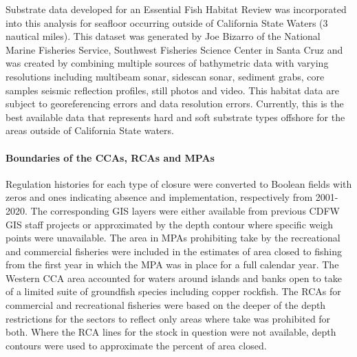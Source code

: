 \documentclass[11pt,
  english,
  a4paper,
]{article}
\begin{document}
Substrate data developed for an Essential Fish Habitat Review was incorporated into this analysis for seafloor occurring outside of California State Waters (3 nautical miles). This dataset was generated by Joe Bizarro of the National Marine Fisheries Service, Southwest Fisheries Science Center in Santa Cruz and was created by combining multiple sources of bathymetric data with varying resolutions including multibeam sonar, sidescan sonar, sediment grabs, core samples seismic reflection profiles, still photos and video. This habitat data are subject to georeferencing errors and data resolution errors. Currently, this is the best available data that represents hard and soft substrate types offshore for the areas outside of California State waters.

\leavevmode\tagmcend\tagstructend\par


\hypertarget{boundaries-of-the-ccas-rcas-and-mpas}{%
\paragraph{Boundaries of the CCAs, RCAs and MPAs}\label{boundaries-of-the-ccas-rcas-and-mpas}}

\leavevmode\tagmcend\tagstructend


Regulation histories for each type of closure were converted to Boolean fields with zeros and ones indicating absence and implementation, respectively from 2001-2020. The corresponding GIS layers were either available from previous CDFW GIS staff projects or approximated by the depth contour where specific weigh points were unavailable. The area in MPAs prohibiting take by the recreational and commercial fisheries were included in the estimates of area closed to fishing from the first year in which the MPA was in place for a full calendar year. The Western CCA area accounted for waters around islands and banks open to take of a limited suite of groundfish species including copper rockfish. The RCAs for commercial and recreational fisheries were based on the deeper of the depth restrictions for the sectors to reflect only areas where take was prohibited for both. Where the RCA lines for the stock in question were not available, depth contours were used to approximate the percent of area closed.

\leavevmode\tagmcend\tagstructend\par
\end{document}
